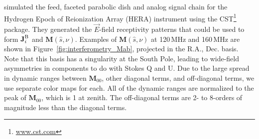 \cite{Fagnoni.16} simulated the feed, faceted parabolic dish and analog signal chain for the Hydrogen Epoch of Reionization Array (HERA) instrument using the CST\footnote{\url{www.cst.com}} package. They generated the $\vec{E}$-field receptivity patterns that could be used to form $\textbf{J}_i^{\rm B}$ and $\textbf{M}(\hat{s},\nu)$. Examples of $\textbf{M}(\hat{s},\nu)$ at 120\,MHz and 160\,MHz are shown in Figure~\ref{fig:interferometry_Mab}, projected in the R.A., Dec. basis. Note that this basis has a singularity at the South Pole, leading to wide-field asymmetries in components to do with Stokes Q and U. Due to the large spread in dynamic ranges between $\textbf{M}_{00}$, other diagonal terms, and off-diagonal terms, we use separate color maps for each. All of the dynamic ranges are normalized to the peak of $\textbf{M}_{00}$, which is 1 at zenith. The off-diagonal terms are 2- to 8-orders of magnitude less than the diagonal terms.


